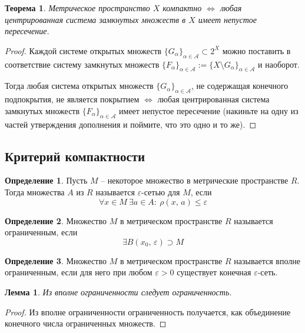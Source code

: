 \documentclass[a4paper,12pt]{article}
\renewcommand{\leq}{\ensuremath{\leqslant}}
\theoremstyle{plain}
\newtheorem{theorem}{Теорема}[section]
\newtheorem{lemma}{Лемма}[section]
\theoremstyle{definition}
\newtheorem{definition}{Определение}[section]
\theoremstyle{remark}
\begin{document}
\begin{theorem}
	Метрическое пространство $X$ компактно $\Leftrightarrow$ любая центрированная система замкнутых множеств в $X$ имеет непустое пересечение.
\end{theorem}

\begin{proof}
	Каждой системе открытых множеств $\{G_\alpha\}_{\alpha \in \mathcal{A}} \subset 2^X$ можно поставить в соответствие систему замкнутых множеств $\{F_\alpha\}_{\alpha \in \mathcal{A}} := \{X \setminus G_\alpha\}_{\alpha \in \mathcal{A}}$ и наоборот.

	Тогда любая система открытых множеств $\{G_\alpha\}_{\alpha \in \mathcal{A}}$, не содержащая конечного подпокрытия, не является покрытием $\Leftrightarrow$ любая центрированная система замкнутых множеств $\{F_\alpha\}_{\alpha \in \mathcal{A}}$ имеет непустое пересечение (накиньте на одну из частей утверждения дополнения и поймите, что это одно и то же).
\end{proof}

\subsection{Критерий компактности}
\begin{definition}
	Пусть $M$ -- некоторое множество в метрические пространстве $R$. Тогда множества $A$ из $R$ называется $\varepsilon$-сетью для $M$, если
	\[
		\forall x \in M \: \exists a \in A :\: \rho(x,\, a) \leq \varepsilon
	\]
\end{definition}

\begin{definition}
	Множество $M$ в метрическом пространстве $R$ называется ограниченным, если
	\[
		\exists B(x_0,\, \varepsilon) \supset M
	\]
\end{definition}

\begin{definition}
	Множество $M$ в метрическом пространстве $R$ называется вполне ограниченным, если для него при любом $\varepsilon > 0$ существует конечная $\varepsilon$-сеть.
\end{definition}

\begin{lemma}
	Из вполне ограниченности следует ограниченность.
\end{lemma}

\begin{proof}
	Из вполне ограниченности ограниченность получается, как объединение конечного числа ограниченных множеств.
\end{proof}
\end{document}
